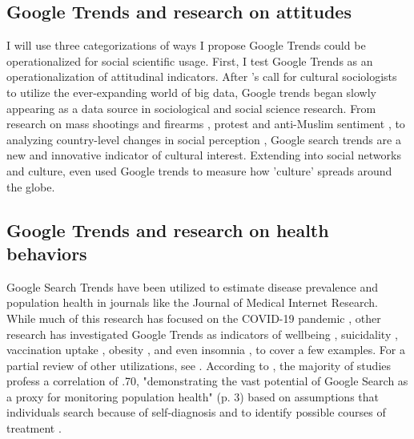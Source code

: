 \subsection{Google Trends and research on attitudes}

I will use three categorizations of ways I propose Google Trends could
be operationalized for social scientific usage. First, I test Google
Trends as an operationalization of attitudinal indicators. 
After \citet{bailCulturalEnvironmentMeasuring2014}'s call for
cultural sociologists to utilize the ever-expanding world of big data,
Google trends began slowly appearing as a data source in sociological and
social science research. From research on mass shootings and firearms \citep{brownsteinInternetSearchPatterns2020, semenzaInformationseekingWakeTragedy2020}, 
protest and anti-Muslim sentiment \citep{bailUsingInternetSearch2018,barrieSearchingRacismGeorge2020,grossThereFergusonEffect2017},
to analyzing country-level changes in social perception \citep{reyes_etal18},
Google search trends are a new and innovative indicator of cultural interest.
Extending into social networks and culture, \citet{bailPrestigeProximityPrejudice2019}
even used Google trends to measure how 'culture' spreads around the globe.

\subsection{Google Trends and research on health behaviors}

Google Search Trends have been utilized to estimate disease prevalence
and population health in journals like the Journal of
Medical Internet Research. While much of this research has focused on
the COVID-19 pandemic \citep{jimenez_etal20, jimenezCOVID19SymptomGoogle2020, limEstimatingInformationSeekingBehaviour2020, mavraganiCOVID19PredictabilityUnited2020, nguyenGoogleTrendsAnalysis2020, todorovaInternetBasedData2021, mingUnderstandingHealthCommunication2021},
other research has investigated Google Trends as indicators of wellbeing
\citep{brodeurCOVID19LockdownsWellbeing2021, carpiTwitterSubjectiveWellBeing2020, duCOVID19IncreasesOnline2020},
suicidality \citep{burnettTimeTrendsPublic2020}, 
vaccination uptake \citep{dalumhansenEnsembleLearnedVaccination2016}, 
obesity \citep{sarigulNowcastingObesityUsing2014}, 
and even insomnia \citep{zittingGoogleTrendsReveal2020},
to cover a few examples. For a partial review of other utilizations, see \citet{nutiUseGoogleTrends2014}. According to \citet{jaidkaInformationseekingVsSharing2021}, the majority of studies profess
a correlation of \> .70, "demonstrating the vast potential of Google
Search as a proxy for monitoring population health" (p. 3) based on
assumptions that individuals search because of self-diagnosis and to
identify possible courses of treatment \citep{dechoudhurySeekingSharingHealth2014}.



